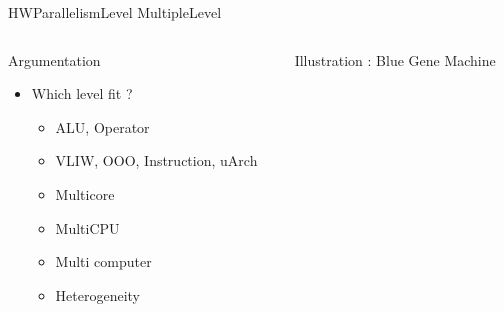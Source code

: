 %
\begin{Frame}{HWParallelismLevel MultipleLevel}

  \begin{columns}[t]
    \begin{column}{4cm} %
      \begin{block}{Argumentation}
        \begin{itemize}
        \item Which level fit ?
          \begin{itemize}
          \item ALU, Operator
          \item VLIW, OOO, Instruction, uArch
          \item Multicore
          \item MultiCPU
          \item Multi computer
          \item Heterogeneity
          \end{itemize}
        \end{itemize}
      \end{block} 
    \end{column}
    
    \begin{column}{10cm} %
      \begin{block}{Illustration : Blue Gene Machine}
      \end{block}   
    \end{column}
  \end{columns}  
\end{Frame}


